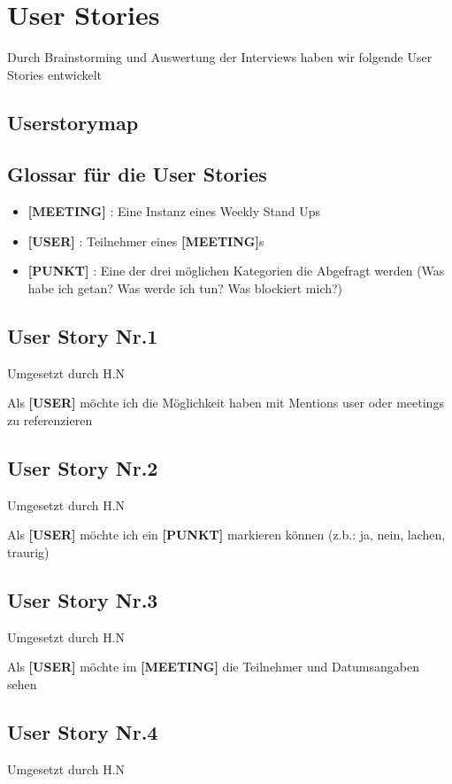 \chapter{User Stories}

Durch Brainstorming und Auswertung der Interviews haben wir folgende User Stories entwickelt

\section{Userstorymap}

\section{Glossar für die User Stories}
\begin{itemize}
\item \textbf{[MEETING]} : Eine Instanz eines Weekly Stand Ups
\item \textbf{[USER]} : Teilnehmer eines \textbf{[MEETING]}s 
\item \textbf{[PUNKT]} : Eine der drei möglichen Kategorien die Abgefragt werden (Was habe ich getan? Was werde ich tun? Was blockiert mich?)
\end{itemize}
\section{User Story Nr.1} 
{\tiny{Umgesetzt durch H.N}} 

Als \textbf{[USER]} möchte ich die Möglichkeit haben mit Mentions user oder meetings zu referenzieren

\section{User Story Nr.2}
{\tiny{Umgesetzt durch H.N}} 

Als \textbf{[USER]} möchte ich ein \textbf{[PUNKT]} markieren können (z.b.: ja, nein, lachen, traurig)
\section{User Story Nr.3}
{\tiny{Umgesetzt durch H.N}}

Als \textbf{[USER]} möchte im \textbf{[MEETING]} die Teilnehmer und Datumsangaben sehen
\section{User Story Nr.4 }
{\tiny{Umgesetzt durch H.N}} 

